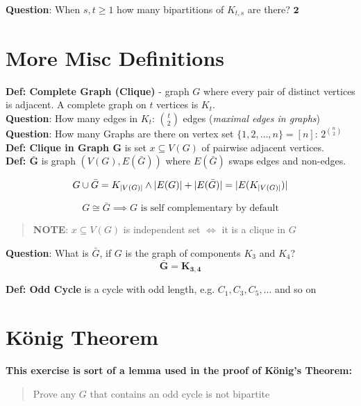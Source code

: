 \documentclass{article}
\begin{document}
\noindent\textbf{Question}: When $s,t \ge 1$ how many bipartitions of $K_{t,s}$ are there? $\mathbf{2}$ \\


\section{More Misc Definitions}

\noindent\textbf{Def: Complete Graph (Clique)} - graph $G$ where every pair of distinct vertices is adjacent. A complete graph on $t$ vertices is $K_t$. \\

\noindent\textbf{Question}: How many edges in $K_t$: $t\choose{2}$ edges (\emph{maximal edges in graphs}) \\
\noindent\textbf{Question}: How many Graphs are there on vertex set $\{1,2,\dots,n\} = [n]$: $2^{n\choose{2}}$ \\

\noindent\textbf{Def: Clique in Graph $\mathbf{G}$} is set $x \subseteq V(G)$ of pairwise adjacent vertices. \\
\noindent\textbf{Def: $\mathbf{\bar{G}}$} is graph $(V(G), E(\bar{G}))$ where $E(\bar{G})$ swaps edges and non-edges. 

$$G \cup \bar{G} = K_{|V(G)|} \space \land \space |E(G)| + |E(\bar{G})| = |E(K_{|V(G)|})|$$

$$G \cong \bar{G} \implies G \text{ is self complementary by default}$$

\begin{quote}
    \centering
    \textbf{NOTE}: $x \subseteq V(G)$ is independent set $\iff$ it is a clique in $G$
\end{quote}

\noindent\textbf{Question}: What is $\bar{G}$, if $G$ is the graph of components $K_3$ and $K_4$? \\
$$\mathbf{\bar{G} = K_{3,4}}$$

\noindent\textbf{Def: Odd Cycle} is a cycle with odd length, e.g. $C_1, C_3, C_5, \dots$ and so on \\ 

\newpage
\section{König Theorem}


\textbf{This exercise is sort of a lemma used in the proof of König's Theorem:}
\begin{quote}
    \centering
    Prove any $G$ that contains an odd cycle is not bipartite
\end{quote}
\end{document}
